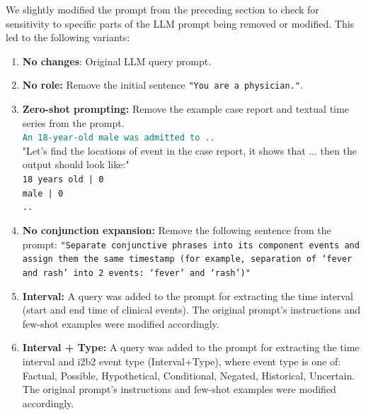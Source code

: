 We slightly modified the prompt from the preceding section to check for sensitivity to specific parts of the LLM prompt being removed or modified.
This led to the following variants:
\begin{enumerate}
    \item \textbf{No changes}: Original LLM query prompt. %
    
    \item \textbf{No role:} Remove the initial sentence \texttt{"You are a physician."}.
    
    \item \textbf{Zero-shot prompting:} Remove the example case report and textual time series from the prompt. \\
    \textcolor{teal}{\texttt{An 18-year-old male was admitted to ..}}\\
    "Let's find the locations of event in the case report, it shows that ... then the output should look like:"\\
    \texttt{18 years old | 0 \\
    male | 0 \\
    ..}

    \item \textbf{No conjunction expansion:} Remove the following sentence from the prompt: \texttt{"Separate conjunctive phrases into its component events and assign them the same timestamp (for example, separation of ‘fever and rash’ into 2 events: ‘fever’ and ‘rash’)"}
    
    \item \textbf{Interval:} A query was added to the prompt for extracting the time interval (start and end time of clinical events). The original prompt’s instructions and few-shot examples were modified accordingly. 
    
    \item \textbf{Interval + Type:} A query was added to the prompt for extracting the time interval and i2b2
    event type (Interval+Type), where event type is one of: Factual, Possible, Hypothetical, Conditional, Negated, Historical, Uncertain. The original prompt’s instructions and few-shot examples were modified accordingly. 
\end{enumerate}


